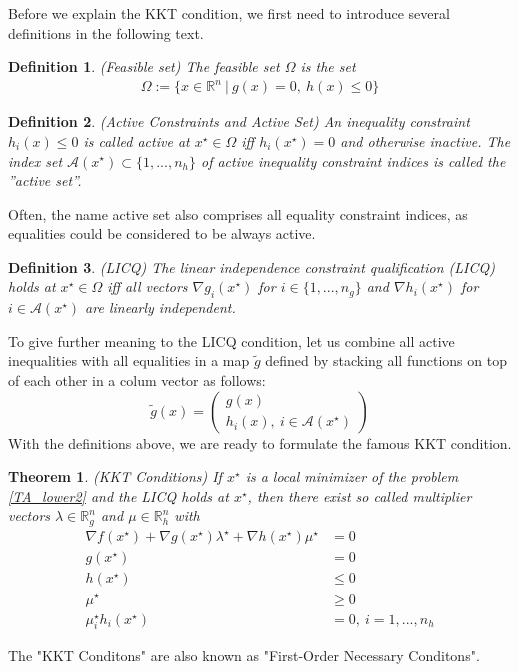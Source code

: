 \documentclass  [
  paper    = a4,
  BCOR     = 10mm,
  twoside,
  fontsize = 12pt,
  fleqn,
  toc      = bibnumbered,
  toc      = listofnumbered,
  numbers  = noendperiod,
  headings = normal,
  listof   = leveldown,
  version  = 3.03
]                                       {scrreprt}
\newcommand{\<}{\langle}
\renewcommand{\>}{\rangle}
\newtheorem{theorem}{Theorem}
\newtheorem{definition}{Definition}
\begin{document}
Before we explain the KKT condition, we first need to introduce several definitions in the following text. 
\begin{definition}(Feasible set) The feasible set $\Omega$ is the set 
	\begin{align}
		\Omega:= \{x \in \mathbb{R}^n \ | \ g(x)= 0 , \ h(x)	\leq 0 \}	
	\end{align}
\end{definition}	
\begin{definition}(Active Constraints and Active Set) An inequality constraint $h_i(x) \leq 0$ is called active at $x^\star \in  \Omega$  iff  $h_i(x^\star) = 0$ and otherwise inactive. The index set $\mathcal{A}(x^\star) \subset \{1, ..., n_h\}$  of active inequality constraint indices is called the ”active set”.
\end{definition}
Often, the name active set also comprises all equality constraint indices, as equalities could be considered to be
always active. 
\begin{definition} (LICQ) The linear independence constraint qualification (LICQ) holds at $x^\star \in  \Omega $ iff all vectors $\nabla g_i(x^\star)$ for $i \in \{1, ..., n_g \}$ and $\nabla h_i(x^\star)$ for  $i \in \mathcal{A}(x^\star)$ are linearly independent.
	\label{df_LICO}
\end{definition}

To give further meaning to the LICQ condition, let us combine all active inequalities with all equalities in a map $\tilde{g}$ defined by stacking all functions on top of each other in a colum vector as follows:
\begin{equation}
	\tilde{g}(x) =  \begin{pmatrix} g(x) \\ h_i(x), \ i \in \mathcal{A}(x^\star)    \end{pmatrix}
\end{equation}
With the definitions above, we are ready to formulate the famous KKT condition. 

\begin{theorem}(KKT Conditions)
If $x^\star$ is a local minimizer of the problem \ref{TA_lower2} and the LICQ holds at $x^\star$, then there exist
so called multiplier vectors $\lambda \in \mathbb{R}^n_g$ and $\mu \in \mathbb{R}^n_h$ with 
   \begin{subequations}
	\begin{align}
		 \nabla f(x^\star) + \nabla g(x^\star) \lambda^\star +  \nabla h(x^\star) \mu^\star &= 0 \\
		 g(x^\star)	 &= 0   \\
	     h(x^\star)	&\leq 0  \label{kkt_smaller}\\
	     \mu^\star & \geq 0 \\
	     \mu_i^\star  h_i(x^\star) &=0 , \  i = 1, ..., n_h \label{kkt_active}
	\end{align}
\end{subequations}
\label{TH_KKT}
\end{theorem}
The "KKT Conditons" are also known as "First-Order Necessary Conditons". 
\end{document}
